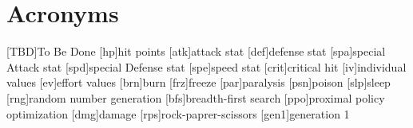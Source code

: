 
\chapter*{Acronyms}

\begin{acronym}
	[TBD]{To Be Done}
	[hp]{hit points}
	[atk]{attack stat}
	[def]{defense stat}
	[spa]{special Attack stat}
	[spd]{special Defense stat}
	[spe]{speed stat}
	[crit]{critical hit}
	[iv]{individual values}
	[ev]{effort values}
	[brn]{burn}
	[frz]{freeze}
	[par]{paralysis}
	[psn]{poison}
	[slp]{sleep}
	[rng]{random number generation}
	[bfs]{breadth-first search}
	[ppo]{proximal policy optimization}
	[dmg]{damage}
	[rps]{rock-paprer-scissors}
	[gen1]{generation 1}
\end{acronym}
